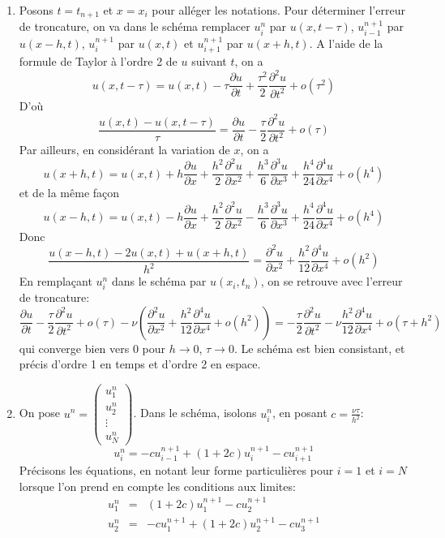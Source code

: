 \documentclass[a4paper,11pt]{article}
\begin{document}
\begin{enumerate}
\item Posons $t=t_{n+1}$ et $x=x_i$ pour alléger les notations.
Pour déterminer l'erreur de troncature, on va dans le schéma remplacer $u_i^n$ par $u(x,t-\tau)$, $u_{i-1}^{n+1}$ par $u(x-h,t)$, $u_i^{n+1}$ par $u(x,t)$ et $u_{i+1}^{n+1}$ par $u(x+h,t)$. A l'aide de la formule de Taylor à l'ordre 2 de $u$ suivant $t$, on a
\[u(x,t-\tau)=u(x,t)-\tau\frac{\partial u}{\partial t}+\frac{\tau^2}{2}\frac{\partial^2u}{\partial t^2}+o(\tau^2)\]
D'où
\[\frac{u(x,t) - u(x,t-\tau)}{\tau}  =\frac{\partial u}{\partial t}-\frac{\tau}{2}\frac{\partial^2u}{\partial t^2}+o(\tau)\]
Par ailleurs, en considérant la variation de $x$, on a
\[u(x+h,t)=u(x,t)+h\frac{\partial u}{\partial x}+\frac{h^2}{2}\frac{\partial^2u}{\partial x^2}+\frac{h^3}{6}\frac{\partial^3u}{\partial x^3}+\frac{h^4}{24}\frac{\partial^4u}{\partial x^4}+o(h^4)\]
et de la même façon
\[u(x-h,t)=u(x,t)-h\frac{\partial u}{\partial x}+\frac{h^2}{2}\frac{\partial^2u}{\partial x^2}-\frac{h^3}{6}\frac{\partial^3u}{\partial x^3}+\frac{h^4}{24}\frac{\partial^4u}{\partial x^4}+o(h^4)\]
Donc
\[\frac{u(x-h,t) - 2u(x,t)+u(x+h,t)}{h^2}  =\frac{\partial^2 u}{\partial x^2}+\frac{h^2}{12}\frac{\partial^4u}{\partial x^4}+o(h^2)\]
En remplaçant $u_i^n$ dans le schéma par $u(x_i,t_n)$, on se retrouve avec l'erreur de troncature:
\[\frac{\partial u}{\partial t}-\frac{\tau}{2}\frac{\partial^2u}{\partial t^2}+o(\tau) -\nu\left(\frac{\partial^2 u}{\partial x^2}+\frac{h^2}{12}\frac{\partial^4u}{\partial x^4}+o(h^2)\right)=-\frac{\tau}{2}\frac{\partial^2u}{\partial t^2}-\nu \frac{h^2}{12}\frac{\partial^4u}{\partial x^4} +o(\tau+h^2)\]
qui converge bien vers 0 pour $h\to 0$, $\tau\to 0$. Le schéma est bien consistant, et précis d'ordre 1 en temps et d'ordre 2 en espace.
\item On pose $u^n=\left(\begin{array}{c}  u_1^n  \\ u_2^n \\\vdots \\ u_N^n \end{array}\right)$. Dans le schéma, isolons $u_i^n$, en posant $c=\frac{\nu\tau}{h^2}$:
\[u_i^n=-c u_{i-1}^{n+1}+(1+2c)u_i^{n+1}-cu_{i+1}^{n+1}\]
Précisons les équations, en notant leur forme particulières pour $i=1$ et $i=N$ lorsque l'on prend en compte les conditions aux limites:
\[\begin{array}{rcl}
u_1^n & = & (1+2c)u_1^{n+1}-cu_2^{n+1}\\
u_2^n & = & -cu_1^{n+1}+(1+2c)u_2^{n+1}-cu_3^{n+1}\\

\end{array}\]
\end{enumerate}
\end{document}
